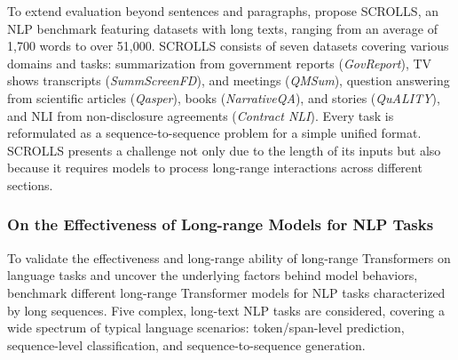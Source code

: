 
To extend evaluation beyond sentences and paragraphs, \citet{shaham2022scrolls} propose \ac{SCROLLS}, an \ac{NLP} benchmark featuring datasets with long texts, ranging from an average of 1,700 words to over 51,000. \ac{SCROLLS} consists of seven datasets covering various domains and tasks: summarization from government reports (\textit{GovReport}), TV shows transcripts (\textit{SummScreenFD}), and meetings (\textit{QMSum}), question answering from scientific articles (\textit{Qasper}), books (\textit{NarrativeQA}), and stories (\textit{QuALITY}), and \ac{NLI} from non-disclosure agreements (\textit{Contract NLI}). Every task is reformulated as a sequence-to-sequence problem for a simple unified format. \ac{SCROLLS} presents a challenge not only due to the length of its inputs but also because it requires models to process long-range interactions across different sections. 

\subsubsection{On the Effectiveness of Long-range Models for NLP Tasks}

To validate the effectiveness and long-range ability of long-range Transformers on language tasks and uncover the underlying factors behind model behaviors, \citet{qin2022nlp} benchmark different long-range Transformer models for \ac{NLP} tasks characterized by long sequences. Five complex, long-text \ac{NLP} tasks are considered, covering a wide spectrum of typical language scenarios: token/span-level prediction, sequence-level classification, and sequence-to-sequence generation.

